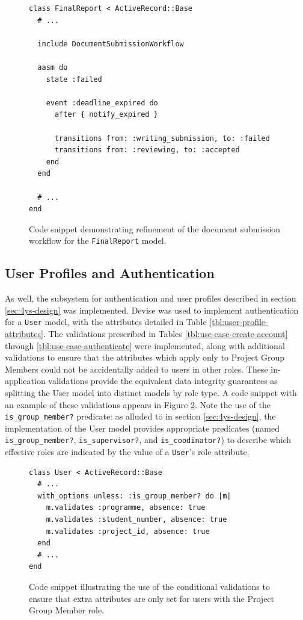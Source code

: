 \begin{figure}[!ht]
  \begin{lstlisting}
class FinalReport < ActiveRecord::Base
  # ...

  include DocumentSubmissionWorkflow

  aasm do
    state :failed

    event :deadline_expired do
      after { notify_expired }

      transitions from: :writing_submission, to: :failed
      transitions from: :reviewing, to: :accepted
    end
  end

  # ...
end
  \end{lstlisting}
  \cprotect\caption{Code snippet demonstrating refinement of the document submission workflow for the \verb!FinalReport! model.}
  \label{fig:final-report-workflow-specialization}
\end{figure}


\subsection{User Profiles and Authentication}

As well, the subsystem for authentication and user profiles described in section \ref{sec:4ys-design} was implemented. Devise was used to implement authentication for a \verb!User! model, with the attributes detailed in Table \ref{tbl:user-profile-attributes}. The validations prescribed in Tables \ref{tbl:use-case-create-account} through \ref{tbl:use-case-authenticate} were implemented, along with additional validations to ensure that the attributes which apply only to Project Group Members could not be accidentally added to users in other roles. These in-application validations provide the equivalent data integrity guarantees as splitting the User model into distinct models by role type. A code snippet with an example of these validations appears in Figure \ref{fig:4ys-user-validations}. Note the use of the \verb!is_group_member?! predicate: as alluded to in section \ref{sec:4ys-design}, the implementation of the User model provides appropriate predicates (named \verb!is_group_member?!, \verb!is_supervisor?!, and \verb!is_coodinator?!) to describe which effective roles are indicated by the value of a \verb!User!’s role attribute.

\begin{figure}[!ht]
  \begin{lstlisting}
class User < ActiveRecord::Base
  # ...
  with_options unless: :is_group_member? do |m|
    m.validates :programme, absence: true
    m.validates :student_number, absence: true
    m.validates :project_id, absence: true
  end
  # ...
end
  \end{lstlisting}
  \caption{Code snippet illustrating the use of the conditional validations to ensure that extra attributes are only set for users with the Project Group Member role.}
  \label{fig:4ys-user-validations}
\end{figure}


